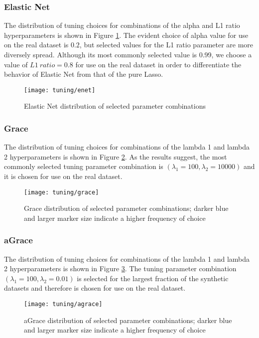 \pagebreak

\subsubsection{Elastic Net}
The distribution of tuning choices for combinations of the alpha and L1 ratio hyperparameters is shown in Figure \ref{fig:tun_enet}. The evident choice of alpha value for use on the real dataset is $0.2$, but selected values for the L1 ratio parameter are more diversely spread. Although its most commonly selected value is 0.99, we choose a value of $L1\ ratio = 0.8$ for use on the real dataset in order to differentiate the behavior of Elastic Net from that of the pure Lasso.
\begin{figure}[H]
	\centering
	\texttt{[image: tuning/enet]}
	\caption{Elastic Net distribution of selected parameter combinations}
	\label{fig:tun_enet}
\end{figure}

\pagebreak

\subsubsection{Grace}
The distribution of tuning choices for combinations of the lambda 1 and lambda 2 hyperparameters is shown in Figure \ref{fig:tun_grace}. As the results suggest, the most commonly selected tuning parameter combination is $(\lambda_1=100,\lambda_2=10000)$ and it is chosen for use on the real dataset.
\begin{figure}[H]
	\centering
	\texttt{[image: tuning/grace]}
	\caption{Grace distribution of selected parameter combinations; darker blue and larger marker size indicate a higher frequency of choice}
	\label{fig:tun_grace}
\end{figure}

\pagebreak

\subsubsection{aGrace}
The distribution of tuning choices for combinations of the lambda 1 and lambda 2 hyperparameters is shown in Figure \ref{fig:tun_agrace}. The tuning parameter combination $(\lambda_1=100,\lambda_2=0.01)$ is selected for the largest fraction of the synthetic datasets and therefore is chosen for use on the real dataset.
\begin{figure}[H]
	\centering
	\texttt{[image: tuning/agrace]}
	\caption{aGrace distribution of selected parameter combinations; darker blue and larger marker size indicate a higher frequency of choice}
	\label{fig:tun_agrace}
\end{figure}

